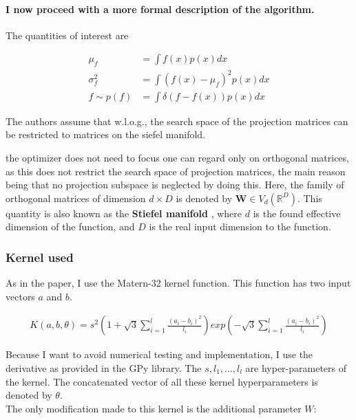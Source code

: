 \paragraph{I now proceed with a more formal description of the algorithm.}
The quantities of interest are

\begin{align}
\mu_f &= \int f(x) p(x) dx \\
\sigma^2_f &= \int ( f(x) - \mu_f )^2 p(x) dx \\
f \sim p(f) &= \int \delta( f - f(x) ) p(x) dx
\end{align}

The authors assume that w.l.o.g., the search space of the projection matrices can be restricted to matrices on the siefel manifold.

 the optimizer does not need to focus one can regard only on orthogonal matrices, as this does not restrict the search space of projection matrices, the main reason being that no projection subspace is neglected by doing this.
Here, the family of orthogonal matrices of dimension $d \times D$ is denoted by $\mathbf{W} \in V_d(\mathbb{R}^D) $.
This quantity is also known as the \textbf{Stiefel manifold} \citep{StiefelBayesianInference} \citep{StatisticsStiefelIntro} \citep{StiefelNonparametric}, where $d$ is the found effective dimension of the function, and $D$ is the real input dimension to the function. \\

\subsubsection{Kernel used}
As in the paper, I use the Matern-32 kernel function.
This function has two input vectors $a$ and $b$.

\begin{align}
K(a,  b, \theta) = s^2 \left( 1 + \sqrt{3} \sum_{i=1}^l \frac{(a_i - b_i)^2}{ \textit{l}_i} \right) exp\left( - \sqrt{3} \sum_{i=1}^l \frac{(a_i - b_i)^2}{ \textit{l}_i} \right)
\end{align}

Because I want to avoid numerical testing and implementation, I use the derivative as provided in the GPy library.
The $s, l_1, \ldots, l_l $ are hyper-parameters of the kernel. 
The concatenated vector of all these kernel hyperparameters is denoted by $\theta$. \\

The only modification made to this kernel is the additional parameter $W$:

